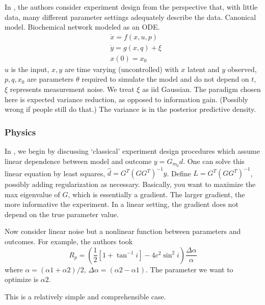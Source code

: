 In \cite{vanlier2012}, the authors consider experiment design from the perspective that, with little data, many different parameter settings adequately describe the data. Canonical model. Biochemical network modeled as an ODE.
\begin{align*}
&\dot{x} = f(x, u, p) \\
&\dot{y} = g(x, q) + \xi \\
&x(0) = x_0
\end{align*}
$u$ is the input, $x, y$ are time varying (uncontrolled) with $x$ latent and $y$ observed, $p, q, x_0$ are parameters $\theta$ required to simulate the model and do not depend on $t$, $\xi$ represents measurement noise. We treat $\xi$ as iid Gaussian. The paradigm chosen here is expected variance reduction, as opposed to information gain. (Possibly wrong if people still do that.) The variance is in the posterior predictive density.

\subsubsection{Physics}
In \cite{berg2003}, we begin by discussing `classical' experiment design procedures which assume linear dependence between model and outcome $y = G_{m_0}d$. One can solve this linear equation by least squares, $\hat{d} = G^T(GG^T)^{-1}y$. Define $L = G^T(GG^T)^{-1}$, possibly adding regularization as necessary. Basically, you want to maximize the max eigenvalue of $G$, which is essentially a gradient. The larger gradient, the more informative the experiment. In a linear setting, the gradient does not depend on the true parameter value.

Now consider linear noise but a nonlinear function between parameters and outcomes. For example, the authors took
\begin{equation}
R_p = \left(\frac{1}{2}[1 + \tan^{-1} i] - 4c^2 \sin^2 i\right) \frac{\Delta \alpha}{\alpha}
\end{equation}
where $\alpha = (\alpha 1 + \alpha2)/2$, $\Delta \alpha = (\alpha 2 - \alpha 1)$. The parameter we want to optimize is $\alpha2$.

This is a relatively simple and comprehensible case.
